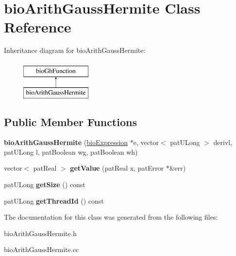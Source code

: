 \hypertarget{classbio_arith_gauss_hermite}{}\section{bio\+Arith\+Gauss\+Hermite Class Reference}
\label{classbio_arith_gauss_hermite}
Inheritance diagram for bio\+Arith\+Gauss\+Hermite\+:\begin{figure}[H]
\begin{center}
\leavevmode
\includegraphics[height=2.000000cm]{classbio_arith_gauss_hermite}
\end{center}
\end{figure}
\subsection*{Public Member Functions}
\begin{DoxyCompactItemize}
\item 
\mbox{\label{classbio_arith_gauss_hermite_a6c79acf4e8a09c8427801b89110bcce8}} 
{\bfseries bio\+Arith\+Gauss\+Hermite} (\hyperlink{classbio_expression}{bio\+Expression} $\ast$e, vector$<$ pat\+U\+Long $>$ derivl, pat\+U\+Long l, pat\+Boolean wg, pat\+Boolean wh)
\item 
\mbox{\label{classbio_arith_gauss_hermite_a31be90b1b21fc19969058b9997ff8f50}} 
vector$<$ pat\+Real $>$ {\bfseries get\+Value} (pat\+Real x, pat\+Error $\ast$\&err)
\item 
\mbox{\label{classbio_arith_gauss_hermite_a3e656c295515a681ed169be28e9f9ab5}} 
pat\+U\+Long {\bfseries get\+Size} () const
\item 
\mbox{\label{classbio_arith_gauss_hermite_ab7b78ce3bf66f31a3803511cfa91f39d}} 
pat\+U\+Long {\bfseries get\+Thread\+Id} () const
\end{DoxyCompactItemize}


The documentation for this class was generated from the following files\+:\begin{DoxyCompactItemize}
\item 
bio\+Arith\+Gauss\+Hermite.\+h\item 
bio\+Arith\+Gauss\+Hermite.\+cc\end{DoxyCompactItemize}
